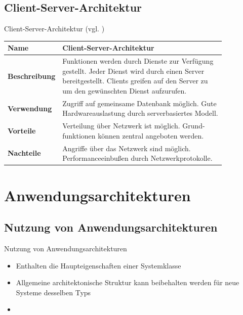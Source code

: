 \documentclass{beamer}
\begin{document}
			\subsection{Client-Server-Architektur}
			\begin{frame}{Client-Server-Architektur (vgl. \cite[ S. 198]{sommer})}
			\begin{tabular}{*{2}{l}}
				\toprule
				\textbf{Name}&\textbf{Client-Server-Architektur}\\
				\midrule\midrule
				\textbf{Beschreibung}&\makecell[l]{Funktionen werden durch Dienste zur Verfügung\\ gestellt. Jeder Dienst wird durch einen Server\\ bereitgestellt. Clients greifen auf den Server zu\\ um den gewünschten Dienst aufzurufen.}\\\midrule
				\textbf{Verwendung}&\makecell[l]{Zugriff auf gemeinsame Datenbank möglich. Gute\\ Hardwareauslastung durch serverbasiertes Modell.}\\\midrule
				\textbf{Vorteile}&\makecell[l]{Verteilung über Netzwerk ist möglich. Grund-\\funktionen können zentral angeboten werden.}\\\midrule
				\textbf{Nachteile}&\makecell[l]{Angriffe über das Netzwerk sind möglich.\\ Performanceeinbußen durch Netzwerkprotokolle.}\\
				\bottomrule
			\end{tabular}
			\end{frame}	
	\section{Anwendungsarchitekturen}
		\subsection{Nutzung von Anwendungsarchitekturen}
			\begin{frame}{Nutzung von Anwendungsarchitekturen}
				\begin{itemize} %
					\item Enthalten die Haupteigenschaften einer Systemklasse
					\item Allgemeine architektonische Struktur kann beibehalten werden für neue Systeme desselben Typs
					\item
				\end{itemize}
			\end{frame}
\end{document}
